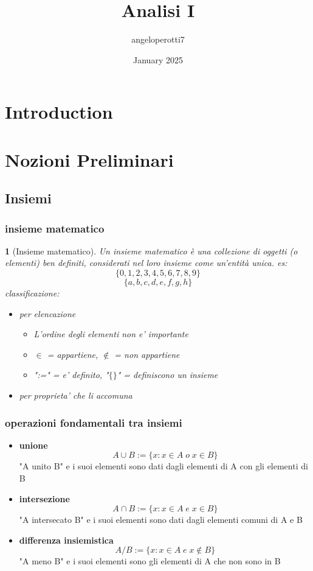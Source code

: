 \documentclass{book}
\title{Analisi I}
\author{angeloperotti7 }
\date{January 2025}
\theoremstyle{mystyle}
\newtheorem*{mydefinition}{}
\begin{document}
\maketitle
\newpage
\section{Introduction}

\section{Nozioni Preliminari}

\subsection{Insiemi}

\subsubsection{insieme matematico}
\begin{mydefinition}[Insieme matematico]
Un \emph{insieme matematico} è una collezione di oggetti
(o elementi) ben definiti, considerati nel loro insieme
come un’entità unica. \newline es:
\[
   \{0, 1, 2, 3, 4, 5, 6, 7, 8, 9\}
\]
\[
   \{a, b, c, d, e, f, g, h\}
\]
\newline
classificazione:
\begin{itemize}
    \item per \emph{elencazione}
        \begin{itemize}
            \item L'ordine degli elementi non e' importante
            \item $\in$ = appartiene, $\notin$ = non appartiene
            \item ":=" = e' definito, "$ \{ \} $" = definiscono un insieme
        \end{itemize}
    \item per \emph{proprieta' che li accomuna}
\end{itemize}
\end{mydefinition}
\newline
\subsubsection{operazioni fondamentali tra insiemi}
\begin{itemize}
    \item \textbf{unione} $$ A\cup B := \{ x:x \in A \; o \; x \in B \}$$
    "A unito B" e i suoi elementi sono dati dagli elementi di A con gli elementi di B
    \item \textbf{intersezione}$$ A\cap B := \{ x:x \in A \; e \; x \in B \}$$
    "A intersecato B" e i suoi elementi sono dati dagli elementi comuni di A e B
    \item \textbf{differenza insiemistica}$$ A/B := \{ x:x \in A \; e \; x \notin B \}$$
    "A meno B" e i suoi elementi sono gli elementi di A che non sono in B
\end{itemize}
\end{document}
